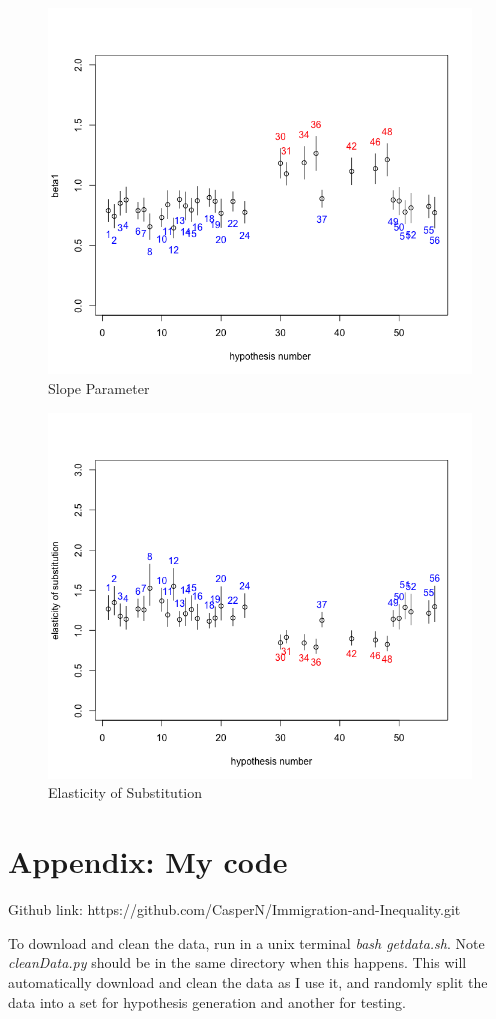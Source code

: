 \documentclass[11pt]{article}
\theoremstyle{definition}
\theoremstyle{remark}
\begin{document}
\begin{figure}[H]
    \centering
    \caption{Slope Parameter}
    \includegraphics[width=.7\textwidth]{slopeFinal.png}

    \label{slo}
\end{figure}

\begin{figure}[H]
    \centering
    \caption{Elasticity of Substitution}
    \includegraphics[width=.7\textwidth]{elasticityFinal.png}

    \label{est}
\end{figure}



\section{Appendix: My code}

Github link: https://github.com/CasperN/Immigration-and-Inequality.git

To download and clean the data, run in a unix terminal \textit{bash getdata.sh}.
Note \textit{cleanData.py} should be in the same directory when this happens.
This will automatically download and clean the data as I use it, and randomly
split the data into a set for hypothesis generation and another for testing.
\end{document}
